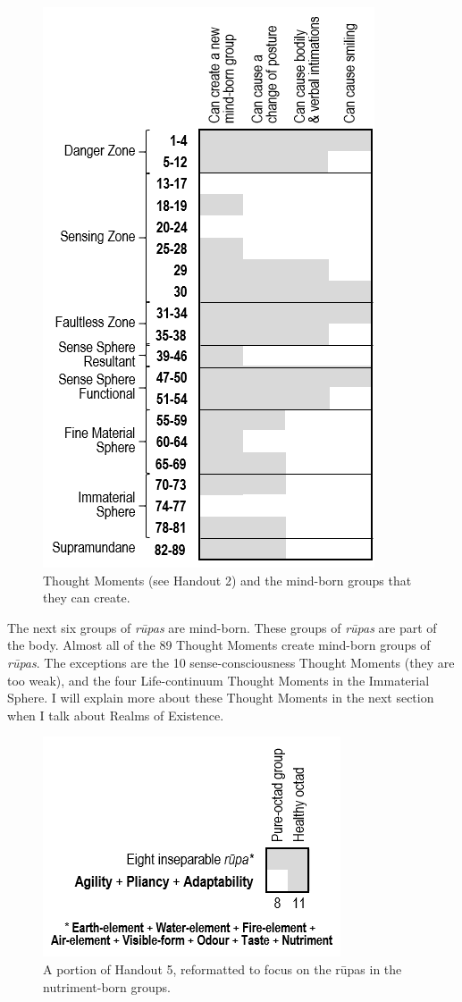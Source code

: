 \begin{figure}[h]
\centering
\includegraphics[width=0.5\linewidth]{./Diagrams/MindBorn}
\caption{Thought Moments (see Handout 2) and the mind-born groups that they can create.}
\label{fig:MindBorn}
\end{figure}

The next six groups of \textit{rūpas} are mind-born. These groups of \textit{rūpas} are part of the body. Almost all of the 89 Thought Moments create mind-born groups of \textit{rūpas}. The exceptions are the 10 sense-consciousness Thought Moments (they are too weak), and the four Life-continuum Thought Moments in the Immaterial Sphere. I will explain more about these Thought Moments in the next section when I talk about Realms of Existence.

\begin{figure}[h]
\centering
\includegraphics[width=0.5\linewidth]{./Diagrams/NutG}
\caption{A portion of Handout 5, reformatted to focus on the rūpas in the nutriment-born groups.}
\label{fig:NutG}
\end{figure}

